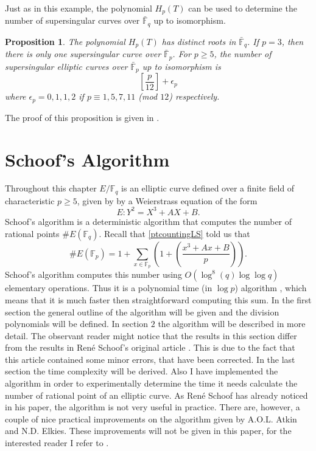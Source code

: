 \documentclass{article}
\numberwithin{equation}{section}
\newtheorem{proposition}[theorem]{Proposition}
\theoremstyle{definition}
\newcommand{\FF}[1]{{\mathbb F}_{#1}} %
\newcommand{\FFCL}[1]{{\bar {\mathbb F}}_{#1}} %
\newcommand{\leg}[2]{\left( \frac{#1}{#2}\right)} %
\begin{document}
Just as in this example, the polynomial $H_p(T)$ can be used to determine the number of supersingular curves over $\FFCL{q}$ up to isomorphism. 

\begin{proposition}
The polynomial $H_p(T)$ has distinct roots in $\FFCL{q}$. If $p=3$, then there is only one supersingular curve over $\FFCL{p}$. For $p \geq 5$, the number of supersingular elliptic curves over $\FFCL{p}$ up to isomorphism is $$\left[ \frac{p}{12} \right] + \epsilon_p$$ where $\epsilon_p=0,1,1,2$ if $p\equiv 1,5,7,11$ (mod $12$) respectively.
\end{proposition}

The proof of this proposition is given in \cite[V.4.1]{Silverman}. \newpage







\section{Schoof's Algorithm}\label{schoofsalgorithm}
Throughout this chapter $E/\FF{q}$ is an elliptic curve defined over a finite field of characteristic $p \geq 5$, given by by a Weierstrass equation of the form $$E:Y^2=X^3+AX+B.$$ Schoof's algorithm is a deterministic algorithm that computes the number of rational points $\#E(\FF{q})$. Recall that \ref{ptcountingLS} told us that $$\#E(\FF{p})=1+\sum_{x \in \FF{p}} \left(1+\leg{x^3+Ax+B}{p}\right).$$ Schoof's algorithm computes this number using $O(\log^8 (q)\log \log q)$ elementary operations. Thus it is a polynomial time (in $\log p$) algorithm , which means that it is much faster then straightforward computing this sum. In the first section the general outline of the algorithm will be given and the division polynomials will be defined.  In section $2$ the algorithm will be described in more detail. The observant reader might notice that the results in this section differ from the results in Ren\'e Schoof's original article \cite{Schoof}. This is due to the fact that this article contained some minor errors, that have been corrected. In the last section the time complexity will be derived. Also I have implemented the algorithm in order to experimentally determine the time it needs calculate the number of rational point of an elliptic curve. As Ren\'e Schoof has already noticed in his paper, the algorithm is not very useful in practice. There are, however, a couple of nice practical improvements on the algorithm given by A.O.L. Atkin and N.D. Elkies. These improvements will not be given in this paper, for the interested reader I refer to \cite{Schoofimprovements}.
\end{document}
